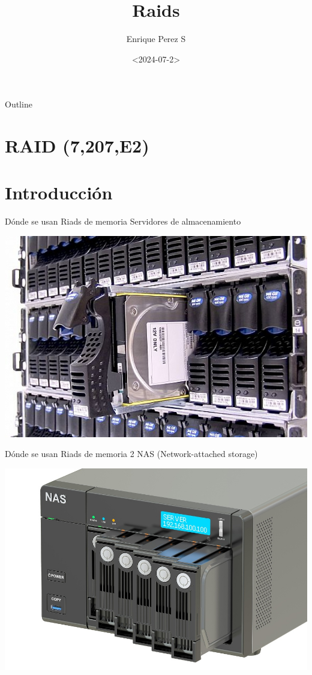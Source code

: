 \documentclass[presentation]{beamer}
\author{Enrique Perez S}
\date{<2024-07-2>}
\title{Raids}
\begin{document}
\maketitle
\begin{frame}{Outline}
\tableofcontents
\end{frame}


\section{RAID (7,207,E2)}
\label{sec:org4ddbac1}
\section{Introducción}
\label{sec:org42fa604}
\begin{frame}[label={sec:org542865e}]{Dónde se usan Riads de memoria}
Servidores de almacenamiento
\begin{center}
\includegraphics[width=.9\linewidth]{./imagenes/Servidores.jpg}
\end{center}
\end{frame}

\begin{frame}[label={sec:org1efd698}]{Dónde se usan Riads de memoria 2}
NAS (Network-attached storage)
\begin{center}
\includegraphics[width=.9\linewidth]{./imagenes/NAS_ejemplo.jpeg}
\end{center}
\end{frame}
\end{document}
